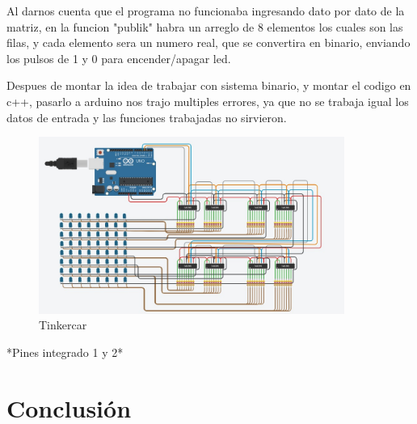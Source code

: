 \documentclass{article}
\begin{document}
  Al darnos cuenta que el programa no funcionaba ingresando dato por dato de la matriz, en la funcion "publik" habra un arreglo de 8 elementos los cuales son las filas, y cada elemento sera un numero real, que se convertira en binario, enviando los pulsos de 1 y 0 para encender/apagar led.
  
   \vspace{1cm}
   
   Despues de montar la idea de trabajar con sistema binario, y montar el codigo en c++, pasarlo a arduino nos trajo multiples errores, ya que no se trabaja igual los datos de entrada y las funciones trabajadas no sirvieron.
  
  \vspace{1cm}
  
  
 
\begin{figure}[h]
\includegraphics[width=10cm]{Tinkercar.jpeg}
\centering
\caption{Tinkercar}
\label{fig:gestion}
\end{figure}


 
 \vspace{1cm}
 
  *Pines integrado 1 y 2*

\vspace{1cm}


\vspace{8cm}
\section{Conclusión} \label{conclulsion}




\vspace{1cm}
\end{document}
